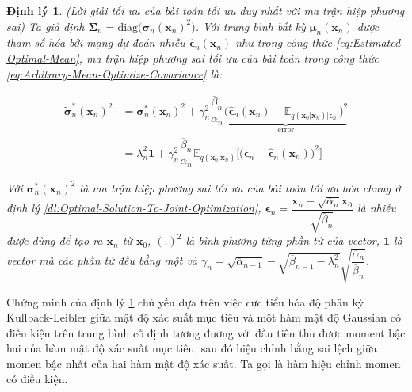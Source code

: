 \documentclass[14pt, a4paper]{article}
\numberwithin{equation}{section}
\numberwithin{figure}{section}
\newtheorem{dl}{Định lý}
\numberwithin{dl}{section}
\numberwithin{md}{section}
\numberwithin{bd}{section}
\numberwithin{dn}{section}
\numberwithin{hq}{section}
\begin{document}
    \begin{dl} \label{dl:Solely-Optimal-Covariance}
        (Lời giải tối ưu của bài toán tối ưu duy nhất với ma trận hiệp phương sai)
        Ta giả định $\boldsymbol{\Sigma}_n = \mathrm{diag} \big( \boldsymbol{\sigma}_n (\boldsymbol{x}_n)^2 \big)$.
        Với trung bình bất kỳ $\boldsymbol{\mu}_n (\boldsymbol{x}_n)$ được tham số hóa bởi mạng dự đoán nhiễu $\hat{\boldsymbol{\epsilon}}_n (\boldsymbol{x}_n)$ như trong công thức \ref{eq:Estimated-Optimal-Mean},
        ma trận hiệp phương sai tối ưu của bài toán trong công thức \ref{eq:Arbitrary-Mean-Optimize-Covariance} là:

        \begin{equation} \label{eq:Corrected-Optimal-Covariance}
            \begin{aligned}
                \tilde{\boldsymbol{\sigma}}_n^{\ast} (\boldsymbol{x}_n)^2 &= \boldsymbol{\sigma}_n^{\ast} (\boldsymbol{x}_n)^2 + \gamma_n^2 \dfrac{\overline{\beta}_n}{\overline{\alpha}_n} \underbrace{\big( \hat{\boldsymbol{\epsilon}}_n (\boldsymbol{x}_n) - \mathbb{E}_{q(\boldsymbol{x}_0 \vert \boldsymbol{x}_n) \lbrack \boldsymbol{\epsilon}_n \rbrack} \big)^2}_{\mathrm{error}} \\
                &= \lambda_n^2 \boldsymbol{1} + \gamma_n^2 \dfrac{\overline{\beta}_n}{\overline{\alpha}_n} \mathbb{E}_{q(\boldsymbol{x}_0 \vert \boldsymbol{x}_n)} \Big\lbrack \big( \boldsymbol{\epsilon}_n - \hat{\boldsymbol{\epsilon}}_n (\boldsymbol{x}_n) \big)^2 \Big\rbrack
            \end{aligned}
        \end{equation}

        Với $\boldsymbol{\sigma}_n^{\ast} (\boldsymbol{x}_n)^2$ là ma trận hiệp phương sai tối ưu của bài toán tối ưu hóa chung ở định lý \ref{dl:Optimal-Solution-To-Joint-Optimization},
        $\boldsymbol{\epsilon}_n = \dfrac{\boldsymbol{x}_n - \sqrt{\overline{\alpha}_n} \boldsymbol{x}_0}{\sqrt{\overline{\beta}_n}}$ là nhiễu được dùng để tạo ra $\boldsymbol{x}_n$ từ $\boldsymbol{x}_0$,
        $(.)^2$ là bình phương từng phần tử của vector, $\boldsymbol{1}$ là vector mà các phần tử đều bằng một và $\gamma_n = \sqrt{\overline{\alpha}_{n-1}} - \sqrt{\overline{\beta}_{n-1} - \lambda_n^2} \sqrt{\dfrac{\overline{\alpha}_n}{\overline{\beta}_n}}$.
    \end{dl}

    Chứng minh của định lý \ref{dl:Solely-Optimal-Covariance} chủ yếu dựa trên việc cực tiểu hóa độ phân kỳ Kullback-Leibler giữa mật độ xác suất mục tiêu và một hàm mật độ Gaussian có điều kiện trên trung bình cố định tương đương với đầu tiên thu được moment bậc hai của hàm mật độ xác suất mục tiêu,
    sau đó hiệu chỉnh bằng sai lệch giữa momen bậc nhất của hai hàm mật độ xác suất.
    Ta gọi là hàm hiệu chỉnh momen có điều kiện.
\end{document}
